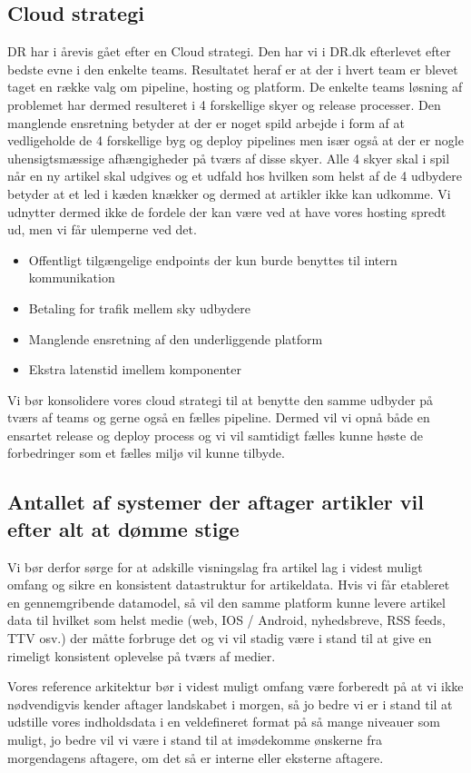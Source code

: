 \documentclass{article}
\begin{document}
\subsection{Cloud strategi}
DR har i årevis gået efter en Cloud strategi. Den har vi i DR.dk efterlevet efter bedste evne i den enkelte teams. Resultatet heraf er at der i hvert team er blevet taget en række valg om pipeline, hosting og platform.
De enkelte teams løsning af problemet har dermed resulteret i 4 forskellige skyer og release processer. Den manglende ensretning betyder at der er noget spild arbejde i form af at vedligeholde de 4 forskellige byg og deploy pipelines men især også at der er nogle uhensigtsmæssige afhængigheder på tværs af disse skyer. 
Alle 4 skyer skal i spil når en ny artikel skal udgives og et udfald hos hvilken som helst af de 4 udbydere betyder at et led i kæden knækker og dermed at artikler ikke kan udkomme. Vi udnytter dermed ikke de fordele der kan være ved at have vores hosting spredt ud, men vi får ulemperne ved det.
\begin{itemize}
\item Offentligt tilgængelige endpoints der kun burde benyttes til intern kommunikation
\item Betaling for trafik mellem sky udbydere
\item Manglende ensretning af den underliggende platform
\item Ekstra latenstid imellem komponenter 
\end{itemize}
Vi bør konsolidere vores cloud strategi til at benytte den samme udbyder på tværs af teams og gerne også en fælles pipeline. Dermed vil vi opnå både en ensartet release og deploy process og vi vil samtidigt fælles kunne høste de forbedringer som et fælles miljø vil kunne tilbyde.


\subsection{Antallet af systemer der aftager artikler vil efter alt at dømme stige}
Vi bør derfor sørge for at adskille visningslag fra artikel lag i videst muligt omfang og sikre en konsistent datastruktur for artikeldata. Hvis vi får etableret en gennemgribende datamodel, så vil den samme platform kunne levere artikel data til hvilket som helst medie (web, IOS / Android, nyhedsbreve, RSS feeds, TTV osv.) der måtte forbruge det og vi vil stadig være i stand til at give en rimeligt konsistent oplevelse på tværs af medier.

Vores reference arkitektur bør i videst muligt omfang være forberedt på at vi ikke nødvendigvis kender aftager landskabet i morgen, så jo bedre vi er i stand til at udstille vores indholdsdata i en veldefineret format på så mange niveauer som muligt, jo bedre vil vi være i stand til at imødekomme ønskerne fra morgendagens aftagere, om det så er interne eller eksterne aftagere.
\end{document}
